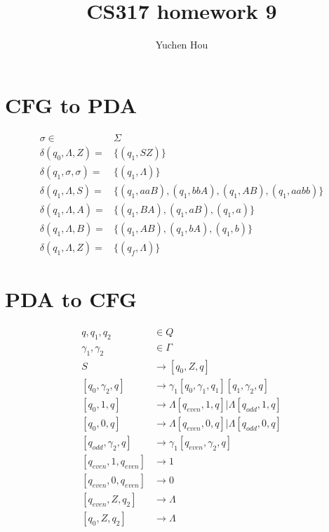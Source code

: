 \documentclass{article}
\begin{document}
\lstset{language=Java}
\title{CS317 homework 9}
\author{Yuchen Hou}
\maketitle

\section{CFG to PDA}
\begin{align*}
\sigma \in& \Sigma\\
\delta(q_0, \Lambda, Z) =& \{(q_1, SZ)\}\\
\delta(q_1, \sigma, \sigma) =& \{(q_1, \Lambda)\}\\
\delta(q_1, \Lambda, S) =& \{(q_1, aaB), (q_1, bbA), (q_1, AB), (q_1, aabb) \}\\
\delta(q_1, \Lambda, A) =& \{(q_1, BA), (q_1, aB), (q_1, a) \}\\
\delta(q_1, \Lambda, B) =& \{(q_1, AB), (q_1, bA), (q_1, b) \}\\
\delta(q_1, \Lambda, Z) =& \{(q_f, \Lambda)\}
\end{align*}

\section{PDA to CFG}
\begin{align*}
q, q_1, q_2 &\in Q\\
\gamma_1, \gamma_2 &\in \Gamma\\
S &\to [q_0, Z, q]\\
[q_0, \gamma_2, q] &\to \gamma_1[q_0, \gamma_1, q_1][q_1, \gamma_2, q]\\
[q_0, 1, q] &\to \Lambda [q_{even}, 1, q] | \Lambda [q_{odd}, 1, q] \\
[q_0, 0, q] &\to \Lambda [q_{even}, 0, q] | \Lambda [q_{odd}, 0, q] \\
[q_{odd}, \gamma_2, q] &\to \gamma_1 [q_{even}, \gamma_2, q]\\
[q_{even}, 1, q_{even}] &\to 1\\
[q_{even}, 0, q_{even}] &\to 0\\
[q_{even}, Z, q_{2}] &\to \Lambda\\
[q_{0}, Z, q_{2}] &\to \Lambda
\end{align*}
\end{document}
